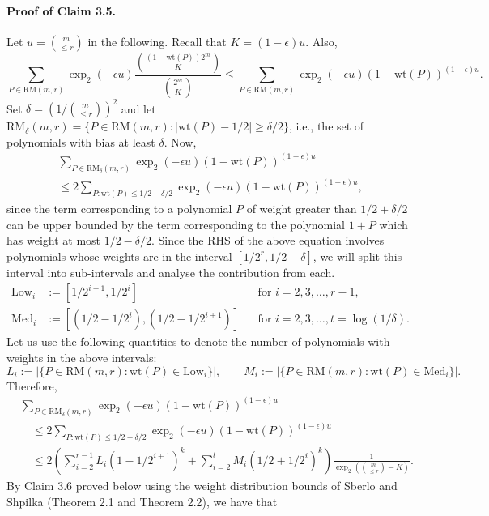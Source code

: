 \paragraph{Proof of Claim 3.5.} Let $u=\binom m{\le r}$ in the following. Recall that $K=(1-\epsilon)u$. Also,
\[\sum_{P\in\mathrm{RM}(m,r)}\operatorname{exp}_2(-\epsilon u)\frac{\binom{(1-\mathrm{wt}(P))2^m}K}{\binom{2^m}K}\le\sum_{P\in\mathrm{RM}(m,r)}\operatorname{exp}_2(-\epsilon u)(1-\mathrm{wt}(P))^{(1-\epsilon)u}.\]
Set $\delta=\left(1/\binom m{\le r}\right)^2$ and let $\mathrm{RM}_\delta(m,r)=\{P\in\mathrm{RM}(m,r):|\mathrm{wt}(P)-1/2|\ge\delta/2\}$, i.e., the set of polynomials with bias at least $\delta$. Now,
\begin{multline*}\sum_{P\in\mathrm{RM}_\delta(m,r)}\operatorname{exp}_2(-\epsilon u)(1-\mathrm{wt}(P))^{(1-\epsilon)u}\\\le2\sum_{P:\mathrm{wt}(P)\le1/2-\delta/2}\operatorname{exp}_2(-\epsilon u)(1-\mathrm{wt}(P))^{(1-\epsilon)u},\end{multline*}
since the term corresponding to a polynomial $P$ of weight greater than $1/2+\delta/2$ can be upper bounded by the term corresponding to the polynomial $1+P$ which has weight at most $1/2-\delta/2$.
Since the RHS of the above equation involves polynomials whose weights are in the interval $[1/2^r,1/2-\delta]$, we will split this interval into sub-intervals and analyse the contribution from each.
\begin{align*}\mathrm{Low}_i&:=[1/2^{i+1},1/2^i]&&\text{for }i=2,3,\ldots,r-1,\\\mathrm{Med}_i&:=[(1/2-1/2^i),(1/2-1/2^{i+1})]&&\text{for }i=2,3,\ldots,t=\log(1/\delta).\end{align*}
Let us use the following quantities to denote the number of polynomials with weights in the above intervals:
\[L_i:=|\{P\in\mathrm{RM}(m,r):\mathrm{wt}(P)\in\mathrm{Low}_i\}|,\qquad M_i:=|\{P\in\mathrm{RM}(m,r):\mathrm{wt}(P)\in\mathrm{Med}_i\}|.\]
Therefore,
\begin{align*}&\sum_{P\in\mathrm{RM}_\delta(m,r)}\operatorname{exp}_2(-\epsilon u)(1-\mathrm{wt}(P))^{(1-\epsilon)u}\\&\quad\le2\sum_{P:\mathrm{wt}(P)\le1/2-\delta/2}\operatorname{exp}_2(-\epsilon u)(1-\mathrm{wt}(P))^{(1-\epsilon)u}\\&\quad\le2\left(\sum_{i=2}^{r-1}L_i(1-1/2^{i+1})^k+\sum_{i=2}^tM_i(1/2+1/2^i)^k\right)\frac1{\operatorname{exp}_2\left(\binom m{\le r}-K\right)}.\end{align*}
By Claim 3.6 proved below using the weight distribution bounds of Sberlo and Shpilka (Theorem 2.1 and Theorem 2.2), we have that
